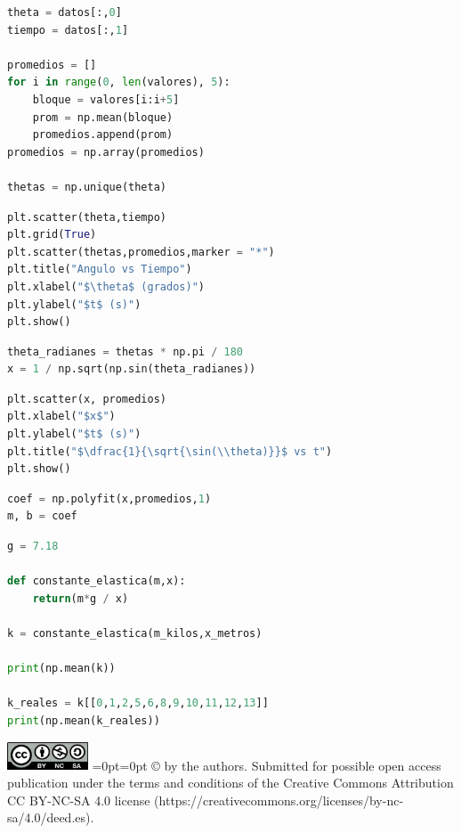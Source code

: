 \documentclass{article}
\begin{document}
\begin{lstlisting}[language=Python, caption= Código para calcular promedios de tiempos]
theta = datos[:,0]
tiempo = datos[:,1]

promedios = []
for i in range(0, len(valores), 5):
    bloque = valores[i:i+5]
    prom = np.mean(bloque)
    promedios.append(prom)
promedios = np.array(promedios)

thetas = np.unique(theta) 

\end{lstlisting}

\begin{lstlisting}[language=Python, caption= Código para graficar datos y 
   promedios]
plt.scatter(theta,tiempo)
plt.grid(True)
plt.scatter(thetas,promedios,marker = "*")
plt.title("Angulo vs Tiempo")
plt.xlabel("$\theta$ (grados)")
plt.ylabel("$t$ (s)")
plt.show()
\end{lstlisting}

\begin{lstlisting}[language=Python, caption= Código para pasar 
   ángulos a radianes y linealizar modelo]
theta_radianes = thetas * np.pi / 180
x = 1 / np.sqrt(np.sin(theta_radianes))
\end{lstlisting}

\begin{lstlisting}[language=Python, caption= Código para graficar 
   modelo linealizado]
plt.scatter(x, promedios)
plt.xlabel("$x$")
plt.ylabel("$t$ (s)")
plt.title("$\dfrac{1}{\sqrt{\sin(\\theta)}}$ vs t")
plt.show()
\end{lstlisting}

\begin{lstlisting}[language=Python, caption= Código para el ajuste lineal]
coef = np.polyfit(x,promedios,1)
m, b = coef
\end{lstlisting}

\begin{lstlisting}[language=Python, caption= Código para calcular $k$]
g = 7.18

def constante_elastica(m,x):
    return(m*g / x)

k = constante_elastica(m_kilos,x_metros)

print(np.mean(k))

k_reales = k[[0,1,2,5,6,8,9,10,11,12,13]]
print(np.mean(k_reales))
\end{lstlisting}


\newpage
\printbibliography



\vspace{1cm}
\vbox{\noindent
\includegraphics[width=0.18\textwidth]{logo-cc-by-nc-sa}}
=0pt=0pt
\hangindent=33mm\vspace{-4mm} 
\small
\copyright{}{\@ \the\year} by the authors. Submitted for possible open access publication under the terms and conditions of the Creative Commons Attribution CC BY-NC-SA 4.0 license (https://creativecommons.org/licenses/by-nc-sa/4.0/deed.es).
\end{document}
